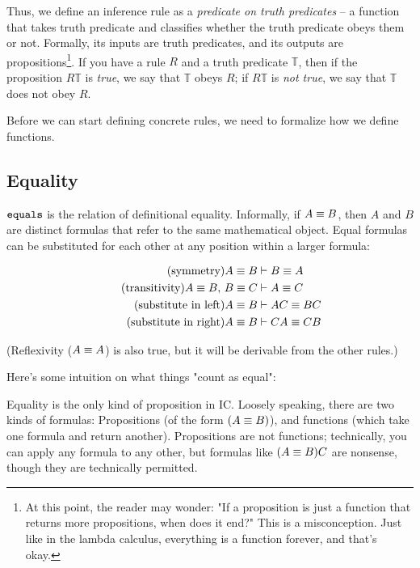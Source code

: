 \documentclass{article}
\begin{document}
  Thus, we define an inference rule as a \emph{predicate on truth predicates} – a function that takes truth predicate and classifies whether the truth predicate obeys them or not. Formally, its inputs are truth predicates, and its outputs are propositions\footnote{At this point, the reader may wonder: "If a proposition is just a function that returns more propositions, when does it end?" This is a misconception. Just like in the lambda calculus, everything is a function forever, and that's okay.}. If you have a rule $R$ and a truth predicate $\mathbb{T}$, then if the proposition $R \mathbb{T}$ is \emph{true}, we say that $\mathbb{T}$ obeys $R$; if $R \mathbb{T}$ is \emph{not true}, we say that $\mathbb{T}$ does not obey $R$.
  
  Before we can start defining concrete rules, we need to formalize how we define functions.
  
  \fi
  
  \subsection{Equality}
  
  $\operatorname{\texttt{equals}}$ is the relation of definitional equality. Informally, if $A \equiv B$, then $A$ and $B$ are distinct formulas that refer to the same mathematical object. Equal formulas can be substituted for each other at any position within a larger formula:
  
  \begin{align*}
    \tag{symmetry}\label{eq_sym}
    A \equiv B &\vdash B \equiv A \\
    \tag{transitivity}\label{eq_trans}
    A \equiv B ,\, B \equiv C &\vdash A \equiv C \\
    \tag{substitute in left}\label{subst_l}
    A \equiv B &\vdash AC \equiv BC \\
    \tag{substitute in right}\label{subst_r}
    A \equiv B &\vdash CA \equiv CB
  \end{align*}
  
  (Reflexivity ($A \equiv A$) is also true, but it will be derivable from the other rules.)
  
  Here's some intuition on what things "count as equal":
  
  Equality is the only kind of proposition in IC. Loosely speaking, there are two kinds of formulas: Propositions (of the form $(A \equiv B)$), and functions (which take one formula and return another). Propositions are not functions; technically, you can apply any formula to any other, but formulas like $(A \equiv B)C$ are nonsense, though they are technically permitted.
  
\end{document}
